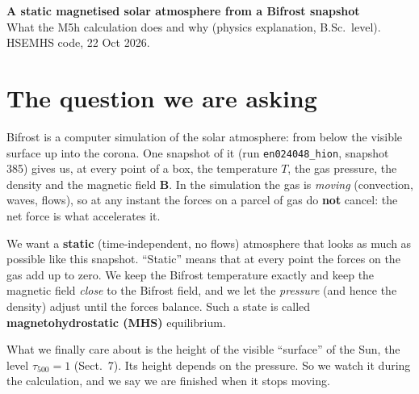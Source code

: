 \documentclass[10pt]{extarticle}
\newcommand{\B}{\mathbf B}\newcommand{\J}{\mathbf J}\newcommand{\Bo}{\mathbf B_{\rm obs}}
\begin{document}
{\Large\bfseries A static magnetised solar atmosphere from a Bifrost snapshot}\\[2pt]
{\small What the M5h calculation does and why (physics explanation, B.Sc.\ level). HSEMHS code, 22 Oct 2026.}

\section{The question we are asking}
Bifrost is a computer simulation of the solar atmosphere: from below the visible surface up into the corona. One snapshot of it (run \texttt{en024048\_hion}, snapshot 385) gives us, at every point of a box, the temperature $T$, the gas pressure, the density and the magnetic field $\B$. In the simulation the gas is \emph{moving} (convection, waves, flows), so at any instant the forces on a parcel of gas do \textbf{not} cancel: the net force is what accelerates it.

We want a \textbf{static} (time-independent, no flows) atmosphere that looks as much as possible like this snapshot. ``Static'' means that at every point the forces on the gas add up to zero. We keep the Bifrost temperature exactly and keep the magnetic field \emph{close} to the Bifrost field, and we let the \emph{pressure} (and hence the density) adjust until the forces balance. Such a state is called \textbf{magnetohydrostatic (MHS)} equilibrium.

What we finally care about is the height of the visible ``surface'' of the Sun, the level $\tau_{500}=1$ (Sect.~7). Its height depends on the pressure. So we watch it during the calculation, and we say we are finished when it stops moving.
\end{document}
